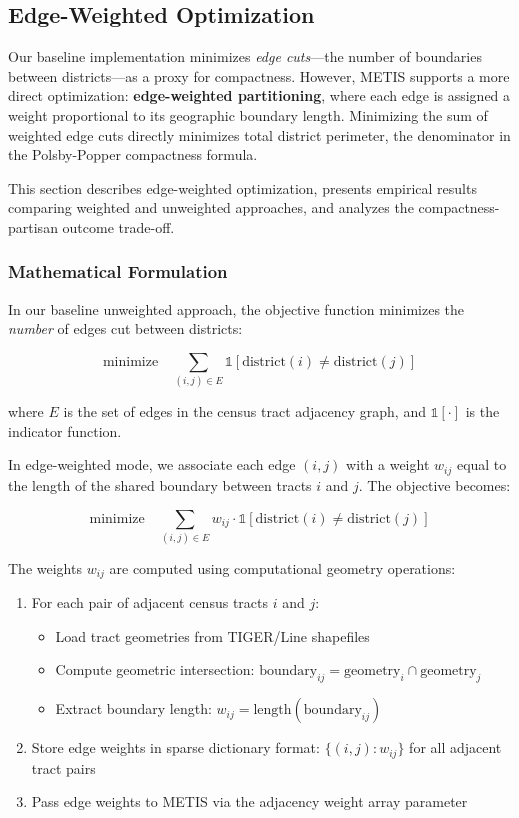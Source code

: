 \subsection{Edge-Weighted Optimization}
\label{sec:edge-weighted-optimization}

Our baseline implementation minimizes \textit{edge cuts}---the number of boundaries between districts---as a proxy for compactness. However, METIS supports a more direct optimization: \textbf{edge-weighted partitioning}, where each edge is assigned a weight proportional to its geographic boundary length. Minimizing the sum of weighted edge cuts directly minimizes total district perimeter, the denominator in the Polsby-Popper compactness formula.

This section describes edge-weighted optimization, presents empirical results comparing weighted and unweighted approaches, and analyzes the compactness-partisan outcome trade-off.

\subsubsection{Mathematical Formulation}

In our baseline unweighted approach, the objective function minimizes the \textit{number} of edges cut between districts:

\[
\text{minimize} \quad \sum_{(i,j) \in E} \mathbb{1}[\text{district}(i) \neq \text{district}(j)]
\]

where $E$ is the set of edges in the census tract adjacency graph, and $\mathbb{1}[\cdot]$ is the indicator function.

In edge-weighted mode, we associate each edge $(i,j)$ with a weight $w_{ij}$ equal to the length of the shared boundary between tracts $i$ and $j$. The objective becomes:

\[
\text{minimize} \quad \sum_{(i,j) \in E} w_{ij} \cdot \mathbb{1}[\text{district}(i) \neq \text{district}(j)]
\]

The weights $w_{ij}$ are computed using computational geometry operations:

\begin{enumerate}
    \item For each pair of adjacent census tracts $i$ and $j$:
    \begin{itemize}
        \item Load tract geometries from TIGER/Line shapefiles
        \item Compute geometric intersection: $\text{boundary}_{ij} = \text{geometry}_i \cap \text{geometry}_j$
        \item Extract boundary length: $w_{ij} = \text{length}(\text{boundary}_{ij})$
    \end{itemize}
    \item Store edge weights in sparse dictionary format: $\{(i,j): w_{ij}\}$ for all adjacent tract pairs
    \item Pass edge weights to METIS via the adjacency weight array parameter
\end{enumerate}

